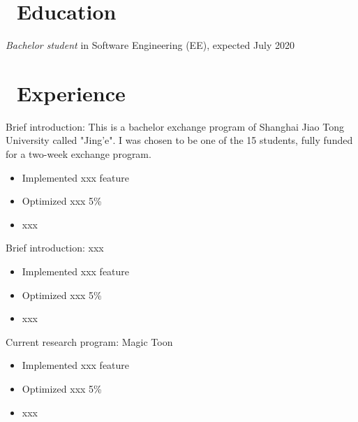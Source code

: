 \documentclass{resume}
\begin{document}




  
\section{\faGraduationCap\ Education}
\textit{Bachelor student} in Software Engineering (EE), expected July 2020

\section{\faUsers\ Experience}
\role{Summer Exchange}
Brief introduction: This is a bachelor exchange program of Shanghai Jiao Tong University called "Jing'e". I was chosen to be one of the 15 students, fully funded for a two-week exchange program.
\begin{itemize}
  \item Implemented xxx feature
  \item Optimized xxx 5\%
  \item xxx
\end{itemize}

Brief introduction: xxx
\begin{itemize}
  \item Implemented xxx feature
  \item Optimized xxx 5\%
  \item xxx
\end{itemize}

Current research program: Magic Toon
\begin{itemize}
  \item Implemented xxx feature
  \item Optimized xxx 5\%
  \item xxx
\end{itemize}
\end{document}
